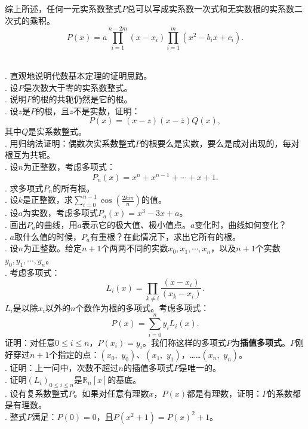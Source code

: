 \documentclass[12pt,UTF8]{ctexbook}
\begin{document}
\begin{appendix}
综上所述，任何一元实系数整式$P$总可以写成实系数一次式和无实数根的实系数二次式的乘积。
$$ P(x) = a\prod_{i=1}^{n-2m}(x - x_i) \prod_{i=1}^m (x^2 - b_ix + c_i). $$

\begin{xt}
    \mbox{} \\
    . 直观地说明代数基本定理的证明思路。\\
    . 设$P$是次数大于零的实系数整式。\\
    . 说明$P$的根的共轭仍然是它的根。\\
    . 设$z$是$P$的根，且$z$不是实数，证明：
    $$ P(x) = (x - z)(x - \overline{z}) Q(x),$$
    其中$Q$是实系数整式。\\
    . 用归纳法证明：偶数次实系数整式$P$的根要么是实数，要么是成对出现的，每对根互为共轭。\\
    . 设$n$为正整数，考虑多项式：
    $$ P_n(x) = x^n + x^{n-1} + \cdots+ x + 1 . $$
    . 求多项式$P_n$的所有根。\\
    . 设$k$是正整数，求$\sum_{i=0}^{n-1}\cos{\left(\frac{2ki\pi}{n}\right)}$的值。\\
    . 设$a$为实数，考虑多项式$P_a(x) = x^3 - 3x + a$。\\
    . 画出$P_a$的曲线，用$a$表示它的极大值、极小值点。$a$变化时，曲线如何变化？\\
    . $a$取什么值的时候，$P_a$有重根？在此情况下，求出它所有的根。\\
    . 设$n$为正整数。给定$n+1$个两两不同的实数$x_0, x_1, \cdots, x_n$，以及$n+1$个实数$y_0, y_1, \cdots, y_n$。\\
    . 考虑多项式：
    $$ L_i(x) = \prod_{k\neq i}\frac{(x - x_i)}{(x_k - x_i)}.$$
    $L_i$是以除$x_i$以外的$n$个数作为根的多项式。考虑多项式：
    $$ P(x) = \sum_{i=0}^n y_i L_i(x).$$
    证明：对任意$0\leqslant i\leqslant n$，$P(x_i) = y_i$。我们称这样的多项式$P$为\textbf{插值多项式}。$P$刚好穿过$n+1$个指定的点：$(x_0,\,\,y_0)$、$(x_1,\,\,y_1)$，……$(x_n,\,\,y_n)$。\\
    . 证明：上一问中，次数不超过$n$的插值多项式$P$是唯一的。\\
    . 证明$\left(L_i\right)_{0\leqslant i \leqslant n}$是$\mathbb{R}_n[x]$的基底。\\
    . 设有复系数整式$P$。如果对任意有理数$x$，$P(x)$都是有理数，证明：$P$的系数都是有理数。\\
    . 整式$P$满足：$P(0)=0$，且$P(x^2 + 1) = P(x)^2 + 1$。\\

\end{xt}
\end{appendix}
\end{document}
